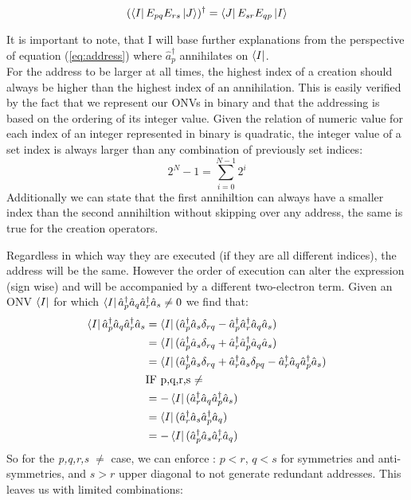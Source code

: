 \begin{equation}
  (\bra{I} E_{pq} E_{rs} \ket{J})^\dagger = \bra{J} E_{sr} E_{qp} \ket{I}
\end{equation}

It is important to note, that I will base further explanations from the perspective of equation (\ref{eq:address}) where $\hat{a}^{\dagger}_{p}$ annihilates on $\bra{I}$.
\\
For the address to be larger at all times, the highest index of a creation should always be higher than the highest index of an annihilation. This is easily verified by the fact that we represent our ONVs in binary and that the addressing is based on the ordering of its integer value. Given the relation of numeric value for each index of an integer represented in binary is quadratic, the integer value of a set index is always larger than any combination of previously set indices:
\begin{equation}
  2^N - 1 = \sum^{N-1}_{i=0} 2^i
\end{equation}
Additionally we can state that the first annihiltion can always have a smaller index than the second annihiltion without skipping over any address, the same is true for the creation operators.

Regardless in which way they are executed (if they are all different indices), the address will be the same. However the order of execution can alter the expression (sign wise) and will be accompanied by a different two-electron term. Given an ONV $\bra{I}$ for which $\bra{I} \hat{a}^\dagger_p \hat{a}_q \hat{a}^\dagger_r \hat{a}_s \neq 0 $ we find that:
\begin{align}
  \bra{I} \hat{a}^\dagger_p \hat{a}_q \hat{a}^\dagger_r \hat{a}_s & = \bra{I} (\hat{a}^\dagger_p \hat{a}_s \delta_{rq} - \hat{a}^\dagger_p \hat{a}^\dagger_r \hat{a}_q \hat{a}_s) \nonumber \\
  & = \bra{I} (\hat{a}^\dagger_p  \hat{a}_s \delta_{rq} + \hat{a}^\dagger_r \hat{a}^\dagger_p \hat{a}_q \hat{a}_s) \nonumber \\
  & = \bra{I} (\hat{a}^\dagger_p  \hat{a}_s \delta_{rq} + \hat{a}^\dagger_r \hat{a}_s \delta_{pq} - \hat{a}^\dagger_r \hat{a}_q \hat{a}^\dagger_p \hat{a}_s) \label{eq:equals} \\
  & \text{IF p,q,r,s $\neq$} \nonumber \\
  & = - \bra{I}(\hat{a}^\dagger_r \hat{a}_q \hat{a}^\dagger_p \hat{a}_s )\\
  & = \bra{I} (\hat{a}^\dagger_r \hat{a}_s \hat{a}^\dagger_p \hat{a}_q ) \\
  & = - \bra{I} (\hat{a}^\dagger_p \hat{a}_s \hat{a}^\dagger_r \hat{a}_q)
\end{align}
So for the \textit{p,q,r,s $\neq$} case, we can enforce : $p<r$, $q<s$ for symmetries and anti-symmetries, and $s > r$ upper diagonal to not generate redundant addresses. This leaves us with limited combinations:

